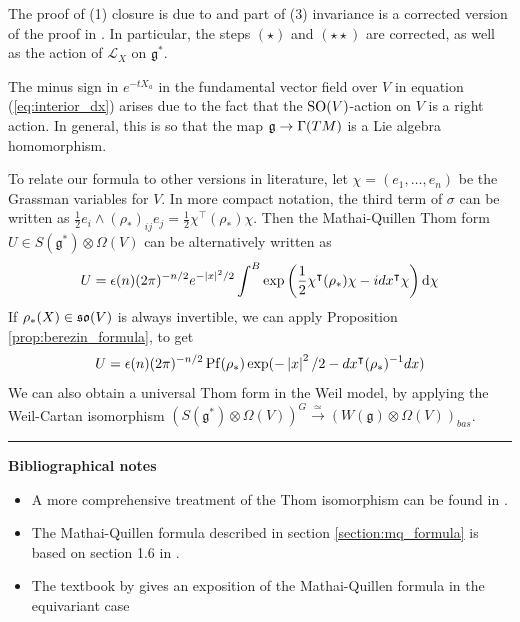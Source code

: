 The proof of (1) closure is due to \citet{guillemin} and part of (3) invariance
is a corrected version of the proof in \citet[p.27]{constantinescu}. In
particular, the steps $(\star)$ and  $(\star\star)$ are corrected, as well as
the action of $\mathcal{L}_X$ on $\mathfrak{g}^*$. 

\begin{remark}
	The minus sign in $e^{-tX_a}$ in the fundamental vector field over $V$ in
	equation (\ref{eq:interior_dx}) arises due to the fact that the
	$\operatorname{SO}(V)$-action on $V$ is a right action. In general, this is so that the
	map $\operatorname{\mathfrak{g}} \to \Gamma(TM)$ is a Lie algebra homomorphism. 
\end{remark}	
 
To relate our formula to other versions in literature, let $\chi =
(e_1,\ldots,e_n)$ be the Grassman variables for $V$. 
In more compact notation, the third term of $\sigma$ can be written  
as $\frac{1}{2} e_i \wedge (\rho_*)_{ij} e_j = \frac{1}{2} \chi^\intercal
(\rho_*) \chi$. Then the Mathai-Quillen Thom form 
$U\in S(\mathfrak{g}^*)\otimes \Omega(V)$ can be alternatively written as 
\begin{equation} \label{eq:universal_thom_form} %
	U = \epsilon(n)(2\pi)^{-n /2}e^{-\abs{x}^2 /2} 
	\int^B \exp \paren{\frac{1}{2}\chi^{\intercal}(\rho_*)\chi -
idx^{\intercal}\chi} \odif{\chi} 
\end{equation}
If $\rho_*(X)\in\operatorname{\mathfrak{so}}(V)$ is always invertible, we can apply
Proposition \ref{prop:berezin_formula}, to get
\[
U = \epsilon(n)(2\pi)^{-n/2} \Pf(\rho_*) \exp(-\abs{x}^2 /2-dx^{\intercal} (\rho_*)^{-1}dx)
\] 
We can also obtain a universal Thom form in the Weil model, by 
applying the Weil-Cartan isomorphism $(S(\mathfrak{g}^*)\otimes \Omega(V))^G
\xrightarrow{\simeq}(W(\mathfrak{g})\otimes \Omega(V))_{bas}$. 

\vspace{5mm}
\hrule 
\vspace{5mm}

\textbf{Bibliographical notes}
{\small
\begin{itemize}
	\item A more comprehensive treatment of the Thom isomorphism can be found in
		\citet{bott_tu}.  
	\item The Mathai-Quillen formula described in section
		\ref{section:mq_formula} is based on section 
		1.6 in \cite{bgv}.
	\item The textbook by \citet{guillemin} gives an exposition of the
	Mathai-Quillen formula in the equivariant case 
\end{itemize}
}
